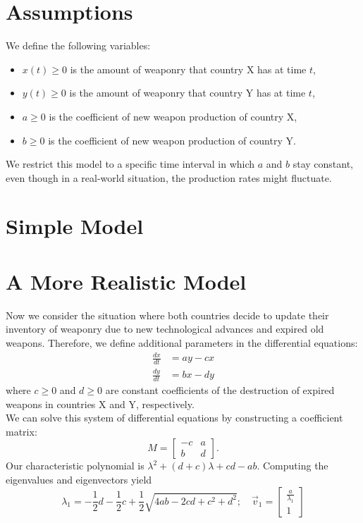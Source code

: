 \section{Assumptions}
We define the following variables:
\begin{itemize}
\item $x(t) \ge 0$ is the amount of weaponry that country X has at time $t$,
\item $y(t) \ge 0$ is the amount of weaponry that country Y has at time $t$,
\item $a \ge 0$ is the coefficient of new weapon production of country X,
\item $b \ge 0$ is the coefficient of new weapon production of country Y.
\end{itemize}
We restrict this model to a specific time interval in which $a$ and $b$ stay constant, even though in a real-world situation, the production rates might fluctuate.

\section{Simple Model}		

\section{A More Realistic Model}
Now we consider the situation where both countries decide to update their inventory of weaponry due to new technological advances and expired old weapons. 
Therefore, we define additional parameters in the differential equations:
\begin{align}
\frac{dx}{dt} & = ay - cx \\
\frac{dy}{dt} & = bx - dy
\end{align}	
where $c \ge 0$ and $d \ge 0$ are constant coefficients of the destruction of expired weapons in countries X and Y, respectively. \\
We can solve this system of differential equations by constructing a coefficient matrix:
\[
M=
  \begin{bmatrix}
    -c & a\\ 
    b & d
  \end{bmatrix}.
\]
Our characteristic polynomial is $\lambda^2 + (d+c)\lambda + cd - ab$. Computing the eigenvalues and eigenvectors yield
$$\lambda_1 = -\frac{1}{2}d - \frac{1}{2}c + \frac{1}{2}\sqrt{4ab -2cd + c^2 + d^2}; \quad \vec{v}_1 = 
\begin{bmatrix}
	\frac{a}{\lambda_1}\\
	1
\end{bmatrix} $$

